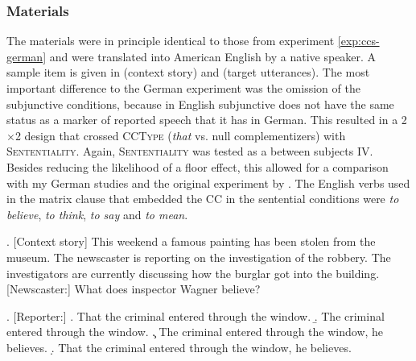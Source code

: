 \subsubsection{Materials}\label{sec:ccs-english-materials}
The materials were in principle identical to those from experiment \ref{exp:ccs-german} and were translated into American English by a native speaker. A sample item is given in \Next (context story) and \NNext (target utterances). The most important difference to the German experiment was the omission of the subjunctive conditions, because in English subjunctive does not have the same status as a marker of reported speech that it has in German. This resulted in a 2$\times$2 design that crossed \textsc{CCType} (\textit{that} vs. null complementizers) with \textsc{Sententiality}. Again, \textsc{Sententiality} was tested as a between subjects IV. Besides reducing the likelihood of a floor effect, this allowed for a comparison with my German studies and the original experiment by \citet{merchant.etal2013}. The English verbs used in the matrix clause that embedded the CC in the sentential conditions were \textit{to believe}, \textit{to think}, \textit{to say} and \textit{to mean}.

\ex. [Context story] This weekend a famous painting has been stolen from the museum. The newscaster is reporting on the investigation of the robbery. The investigators are currently discussing how the burglar got into the building.\\\mbox{}[Newscaster:] What does inspector Wagner believe?\pagebreak


\ex. [Reporter:]
\a. That the criminal entered through the window.
\b. The criminal entered through the window.
\c. The criminal entered through the window, he believes.
\d. That the criminal entered through the window, he believes.

